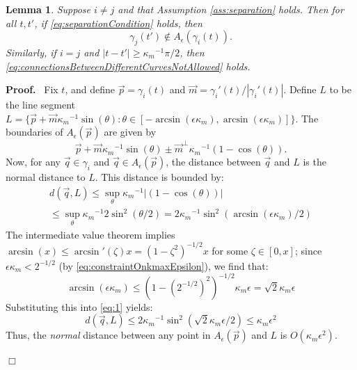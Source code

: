 \documentclass{article}
\newcommand{\nin}{\not\in}
\newenvironment{proof}{
  \noindent\textbf{Proof.}\ }{\hspace*{\fill}
  \begin{math}\Box\end{math}\medskip}
\newtheorem{lemma}[cntr]{Lemma}
\numberwithin{cntr}{section}
\numberwithin{equation}{section}
\newcommand{\abs}[1]{\left| #1 \right|}%
\newcommand{\vp}[0]{{\vec{p}}}
\newcommand{\vq}[0]{{\vec{q}}}
\newcommand{\vm}[0]{{\vec{m}}}
\newcommand{\allowed}[2]{ { A_{#1}(#2) } }
\newcommand{\curvemax}{{\kappa_{m}}}
\newcommand{\curvemaxi}{{\curvemax^{-1}}}
\begin{document}
\begin{lemma}
  \label{lem:separationAllowedRegions}
  Suppose $i \neq j$ and that Assumption \ref{ass:separation} holds.
Then for all $t, t'$, if \eqref{eq:separationCondition} holds, then
  \begin{equation}
    \label{eq:connectionsBetweenDifferentCurvesNotAllowed}
    \gamma_{j}(t')  \nin  \allowed{\epsilon}{\gamma_{i}(t)}.
  \end{equation}
  Similarly, if $i=j$ and $\abs{t-t'} \geq \curvemax^{-1} \pi/2$, then \eqref{eq:connectionsBetweenDifferentCurvesNotAllowed} holds.
\end{lemma}
\begin{proof}
  Fix $t$, and define $\vp=\gamma_{i}(t)$ and $\vm=\gamma_{i}'(t) / \abs{\gamma_{i}'(t)}$. Define $L$ to be the line segment $L= \{ \vp+\vm \curvemaxi \sin(\theta) : \theta \in [-\arcsin(\epsilon \curvemax),\arcsin(\epsilon \curvemax)] \}$. The boundaries of $\allowed{\epsilon}{\vp}$ are given by
\begin{equation*}
  \vp + \vm \curvemaxi \sin(\theta) \pm \vm^{\perp} \curvemaxi (1-\cos(\theta)).
\end{equation*}
Now, for any $\vq \in \gamma_{i} $ and $\vq \in \allowed{\epsilon}{\vp}$, the distance between $\vq$ and $L$ is the normal distance to $L$. This distance is bounded by:
\begin{multline}
  \label{eq:1}
  d(\vq,L) \leq
  \sup_{\theta} \curvemaxi \abs{(1-\cos(\theta)) }\\
  \leq
  \sup_{\theta} \curvemaxi 2 \sin^{2}(\theta/2) =
  2\curvemaxi \sin^{2}( \arcsin(\epsilon \curvemax)/2)
\end{multline}
The intermediate value theorem implies $\arcsin( x) \leq \arcsin'(\zeta) x=(1-\zeta^{2})^{-1/2} x$ for some $\zeta \in [0,x]$; since $\epsilon \curvemax < 2^{-1/2}$ (by \eqref{eq:constraintOnkmaxEpsilon}), we find that:
\begin{equation*}
  \arcsin(\epsilon \curvemax) \leq (1-(2^{-1/2})^{2})^{-1/2} \curvemax \epsilon = \sqrt{2} \curvemax \epsilon
\end{equation*}
Substituting this into \eqref{eq:1} yields:
\begin{equation}
  \label{eq:4}
  d(\vq,L) \leq
  2 \curvemaxi \sin^{2}( \sqrt{2} \curvemax \epsilon/2) \leq \curvemax \epsilon^{2}
\end{equation}
Thus, the \emph{normal} distance between any point in $\allowed{\epsilon}{\vp}$ and $L$ is $O(\curvemax \epsilon^{2})$.


\end{proof}
\end{document}
